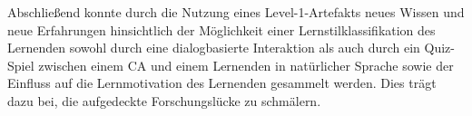 Abschließend konnte durch die Nutzung eines Level-1-Artefakts neues Wissen und neue Erfahrungen hinsichtlich der Möglichkeit 
einer Lernstilklassifikation des Lernenden
sowohl durch eine dialogbasierte Interaktion als auch durch ein Quiz-Spiel zwischen einem CA 
und einem Lernenden in natürlicher Sprache sowie der Einfluss auf die Lernmotivation des Lernenden 
gesammelt werden. Dies trägt dazu bei, die aufgedeckte Forschungslücke zu schmälern.


